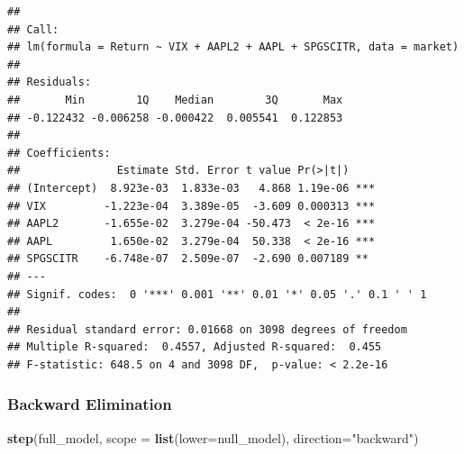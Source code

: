 \documentclass[]{article}
\newenvironment{Shaded}{\begin{snugshade}}{\end{snugshade}}
\newcommand{\KeywordTok}[1]{\textcolor[rgb]{0.13,0.29,0.53}{\textbf{#1}}}
\newcommand{\DataTypeTok}[1]{\textcolor[rgb]{0.13,0.29,0.53}{#1}}
\newcommand{\StringTok}[1]{\textcolor[rgb]{0.31,0.60,0.02}{#1}}
\newcommand{\NormalTok}[1]{#1}
\begin{document}
\begin{verbatim}
## 
## Call:
## lm(formula = Return ~ VIX + AAPL2 + AAPL + SPGSCITR, data = market)
## 
## Residuals:
##       Min        1Q    Median        3Q       Max 
## -0.122432 -0.006258 -0.000422  0.005541  0.122853 
## 
## Coefficients:
##               Estimate Std. Error t value Pr(>|t|)    
## (Intercept)  8.923e-03  1.833e-03   4.868 1.19e-06 ***
## VIX         -1.223e-04  3.389e-05  -3.609 0.000313 ***
## AAPL2       -1.655e-02  3.279e-04 -50.473  < 2e-16 ***
## AAPL         1.650e-02  3.279e-04  50.338  < 2e-16 ***
## SPGSCITR    -6.748e-07  2.509e-07  -2.690 0.007189 ** 
## ---
## Signif. codes:  0 '***' 0.001 '**' 0.01 '*' 0.05 '.' 0.1 ' ' 1
## 
## Residual standard error: 0.01668 on 3098 degrees of freedom
## Multiple R-squared:  0.4557, Adjusted R-squared:  0.455 
## F-statistic: 648.5 on 4 and 3098 DF,  p-value: < 2.2e-16
\end{verbatim}

\subsubsection{Backward Elimination}\label{backward-elimination}

\begin{Shaded}
\begin{Highlighting}[]
\KeywordTok{step}\NormalTok{(full_model, }\DataTypeTok{scope =} \KeywordTok{list}\NormalTok{(}\DataTypeTok{lower=}\NormalTok{null_model), }\DataTypeTok{direction=}\StringTok{"backward"}\NormalTok{)}
\end{Highlighting}
\end{Shaded}
\end{document}
